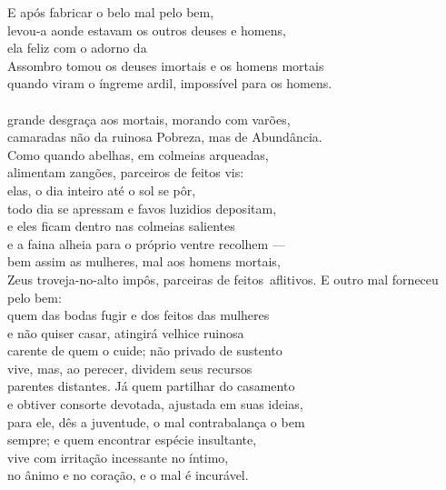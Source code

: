 \begin{pages}
\begin{Rightside}
\quad{}E após fabricar o belo mal pelo bem, \\
levou-a aonde estavam os outros deuses e homens,\\
ela feliz com o adorno da \\
Assombro tomou os deuses imortais e os homens mortais\\
quando viram o íngreme ardil, impossível para os homens.\\
\\
grande desgraça aos mortais, morando com varões,\\
camaradas não da ruinosa Pobreza, mas de Abundância.\\
Como quando abelhas, em colmeias arqueadas,\\
alimentam zangões, parceiros de feitos vis: \\
elas, o dia inteiro até o sol se pôr,\\
todo dia se apressam e favos luzidios depositam,\\
e eles ficam dentro nas colmeias salientes\\
e a faina alheia para o próprio ventre recolhem ---\\
bem assim as mulheres, mal aos homens mortais, \\
Zeus troveja-no-alto impôs, parceiras de feitos\
aflitivos. E outro mal forneceu pelo bem:\\
quem das bodas fugir e dos feitos  das mulheres\\
e não quiser casar, atingirá velhice ruinosa\\
carente de quem o cuide; não privado de sustento \\
vive, mas, ao perecer, dividem seus recursos\\
parentes distantes. Já quem partilhar do casamento\\
e obtiver consorte devotada, ajustada em suas ideias,\\
para ele, dês a juventude, o mal contrabalança o bem\\
sempre; e quem encontrar espécie insultante, \\
vive com irritação incessante no íntimo,\\
no ânimo e no coração, e o mal é incurável.\\


\end{Rightside}
\end{pages}
